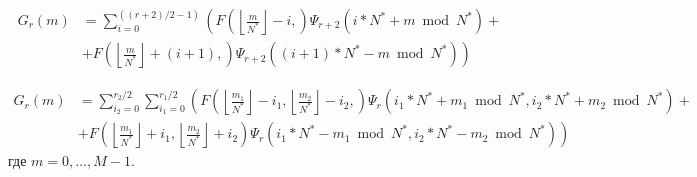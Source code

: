 \begin{equation}
  \label{eq:recv_r0}
  \begin{split}
  G_r(m) &= 
  \sum_{i = 0}^{((r+2)/2 -1)}
  \left(
    F \left( \left \lfloor \frac{m}{N^*} \right \rfloor - i,
      \right)
    \Psi_{r+2}(i*N^* + m\bmod N^*) +{} \right.\\
        & \left. + F \left(
                \left \lfloor \frac{m}{N^*} \right \rfloor + (i+1),
              \right)
            \Psi_{r+2}((i+1)*N^* - m \bmod N^*)
  \right)
  \end{split}
\end{equation}


\begin{equation}
  \label{eq:recv_r0}
  \begin{split}
  G_r(m) &= \sum_{i_2 = 0}^{r_2/2}
  \sum_{i_1 = 0}^{r_1/2}
  \left(
    F \left( \left \lfloor \frac{m_1}{N^*} \right \rfloor - i_1,
             \left \lfloor \frac{m_2}{N^*} \right \rfloor - i_2,
      \right)
    \Psi_{r}(i_1*N^* + m_1\bmod N^*, i_2*N^* + m_2\bmod N^* ) +{} \right.\\
        & \left. + F \left(
                \left \lfloor \frac{m_1}{N^*} \right \rfloor + i_1,
                \left \lfloor \frac{m_2}{N^*} \right \rfloor + i_2
              \right)
            \Psi_{r}(i_1*N^* - m_1 \bmod N^*, i_2*N^* - m_2\bmod N^*)
  \right)
  \end{split}
\end{equation}
где $m = 0, \ldots, M-1$.

